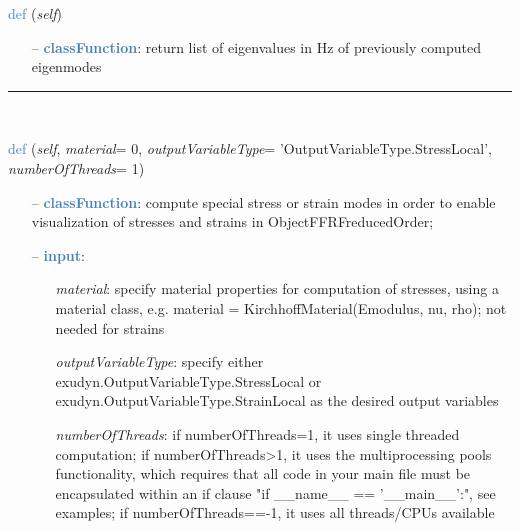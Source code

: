 \begin{itemize}[leftmargin=1.4cm]
\begin{itemize}[leftmargin=1.4cm]
\begin{itemize}[leftmargin=1.4cm]
\begin{itemize}[leftmargin=0.5cm]
\begin{itemize}[leftmargin=1.4cm]
\begin{itemize}[leftmargin=1.4cm]
\begin{itemize}[leftmargin=0.5cm]
\begin{flushleft}
\noindent \textcolor{steelblue}{def {\bf {}}}\label{sec:FEM:FEMinterface:GetEigenFrequenciesHz}
({\it self})
\end{flushleft}
\setlength{\itemindent}{0.7cm}
\begin{itemize}[leftmargin=0.7cm]
\item[--]\textcolor{steelblue}{\bf classFunction}: return list of eigenvalues in Hz of previously computed eigenmodes
\vspace{12pt}\end{itemize}
%
\noindent\rule{8cm}{0.75pt}\vspace{1pt} \\ 
\begin{flushleft}
\noindent \textcolor{steelblue}{def {\bf {}}}\label{sec:FEM:FEMinterface:ComputePostProcessingModes}
({\it self}, {\it material}= 0, {\it outputVariableType}= 'OutputVariableType.StressLocal', {\it numberOfThreads}= 1)
\end{flushleft}
\setlength{\itemindent}{0.7cm}
\begin{itemize}[leftmargin=0.7cm]
\item[--]\textcolor{steelblue}{\bf classFunction}: compute special stress or strain modes in order to enable visualization of stresses and strains in ObjectFFRFreducedOrder;
\item[--]\textcolor{steelblue}{\bf input}: \vspace{-6pt}
\begin{itemize}[leftmargin=1.2cm]
\setlength{\itemindent}{-0.7cm}
\item[]{\it material}: specify material properties for computation of stresses, using a material class, e.g. material = KirchhoffMaterial(Emodulus, nu, rho); not needed for strains
\item[]{\it outputVariableType}: specify either exudyn.OutputVariableType.StressLocal or exudyn.OutputVariableType.StrainLocal as the desired output variables
\item[]{\it numberOfThreads}: if numberOfThreads=1, it uses single threaded computation; if numberOfThreads>1, it uses the multiprocessing pools functionality, which requires that all code in your main file must be encapsulated within an if clause "if \_\_name\_\_ == '\_\_main\_\_':", see examples; if numberOfThreads==-1, it uses all threads/CPUs available

\end{itemize}
\end{itemize}
\end{itemize}
\end{itemize}
\end{itemize}
\end{itemize}
\end{itemize}
\end{itemize}
\end{itemize}
